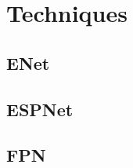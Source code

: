 \section{Techniques}

  \subsection{ENet\cite{paszke2016enet}}

    \Blindtext[3]

  \subsection{ESPNet\cite{mehta2018espnet}}

    \Blindtext[3]

  \subsection{FPN\cite{lin2017feature}}

    \Blindtext[3]
